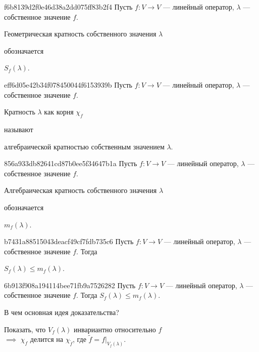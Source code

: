 \begin{note}{f6b8139d2f0e46d38a2dd075ff83b2f4}
    Пусть \( f : V \to V \) --- линейный оператор, \( \lambda \) --- собственное значение \( f \).
    \begin{icloze}{2}Геометрическая кратность собственного значения \( \lambda \)\end{icloze} обозначается \begin{icloze}{1}\( S_f (\lambda) \).\end{icloze}
\end{note}

\begin{note}{eff6d05e42b34f078450044f6153939b}
    Пусть \( f : V \to V \) --- линейный оператор, \( \lambda \) --- собственное значение \( f \).
    \begin{icloze}{1}Кратность \( \lambda \) как корня \( \chi_f \)\end{icloze} называют \begin{icloze}{2}алгебраической кратностью собственным значением \( \lambda \).\end{icloze}
\end{note}

\begin{note}{856a933db82641cd87b0ee5f34647b1a}
    Пусть \( f : V \to V \) --- линейный оператор, \( \lambda \) --- собственное значение \( f \).
    \begin{icloze}{2}Алгебраическая кратность собственного значения \( \lambda \)\end{icloze} обозначается \begin{icloze}{1}\( m_f (\lambda) \).\end{icloze}
\end{note}

\begin{note}{b7431a88515043deacf49cf7fdb735c6}
    Пусть \( f : V \to V \) --- линейный оператор, \( \lambda \) --- собственное значение \( f \).
    Тогда \begin{icloze}{1}\( S_f (\lambda) \leqslant m_f (\lambda) \).\end{icloze}
\end{note}

\begin{note}{6b913f908a194114bee71fb9a7526282}
    Пусть \( f : V \to V \) --- линейный оператор, \( \lambda \) --- собственное значение \( f \).
    Тогда \( S_f (\lambda) \leqslant m_f (\lambda) \).

    В чем основная идея доказательства?

    \begin{cloze}{1}
        Показать, что \( V_f (\lambda) \) инвариантно относительно \( f \) \\
        \phantom{} \hfill \( \implies \) \( \chi_f \) делится на \( \chi_{\tilde f} \), где \( \tilde f = f|_{V_f(\lambda)} \).
    \end{cloze}
\end{note}

